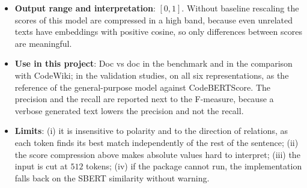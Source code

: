 \begin{itemize}[leftmargin=*, label=\textbullet]
	\item \textbf{Output range and interpretation}: $[0,1]$. Without baseline rescaling the scores of
	this model are compressed in a high band, because even unrelated texts have embeddings with
	positive cosine, so only differences between scores are meaningful.

	\item \textbf{Use in this project}: Doc vs doc in the benchmark and in the comparison with
	CodeWiki; in the validation studies, on all six representations, as the reference of the
	general-purpose model against CodeBERTScore. The precision and the recall are reported next to the
	F-measure, because a verbose generated text lowers the precision and not the recall.

	\item \textbf{Limits}: (i) it is insensitive to polarity and to the direction of relations, as
	each token finds its best match independently of the rest of the sentence; (ii) the score
	compression above makes absolute values hard to interpret; (iii) the input is cut at $512$
	tokens; (iv) if the package cannot run, the implementation falls back on the SBERT similarity
	without warning.
\end{itemize}

